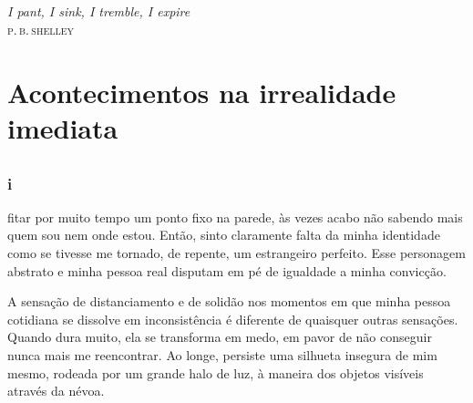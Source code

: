 
\chapter*{}
\thispagestyle{empty}

\vfill
\begin{flushright}
\textit{I pant, I sink, I tremble, I expire}\\
\textsc{p.\,b.\,shelley}
\end{flushright}

\part[Acontecimentos na irrealidade imediata]{Acontecimentos na\break
 irrealidade imediata}

\chapter*{}

\section{i}

 fitar por muito tempo um ponto fixo na parede, às vezes acabo não
 sabendo mais quem sou nem onde estou. Então, sinto claramente falta da minha
 identidade como se tivesse me tornado, de repente, um estrangeiro perfeito.
 Esse personagem abstrato e minha pessoa real disputam em pé de igualdade a
 minha convicção.


A sensação de distanciamento e de solidão nos momentos em que minha pessoa
cotidiana se dissolve em inconsistência é diferente de quaisquer outras
sensações. Quando dura muito, ela se transforma em medo, em pavor de não
conseguir nunca mais me reencontrar. Ao longe, persiste uma silhueta insegura
de mim mesmo, rodeada por um grande halo de luz, à maneira dos objetos
visíveis através da névoa.

